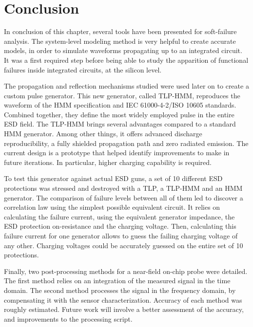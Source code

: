 \section{Conclusion}

In conclusion of this chapter, several tools have been presented for soft-failure analysis.
The system-level modeling method is very helpful to create accurate models, in order to simulate waveforms propagating up to an integrated circuit.
It was a first required step before being able to study the apparition of functional failures inside integrated circuits, at the silicon level.

The propagation and reflection mechanisms studied were used later on to create a custom pulse generator.
This new generator, called TLP-HMM, reproduces the waveform of the HMM specification and IEC 61000-4-2/ISO 10605 standards.
Combined together, they define the most widely employed pulse in the entire ESD field.
The TLP-HMM brings several advantages compared to a standard HMM generator.
Among other things, it offers advanced discharge reproducibility, a fully shielded propagation path and zero radiated emission.
The current design is a prototype that helped identify improvements to make in future iterations.
In particular, higher charging capability is required.

To test this generator against actual ESD guns, a set of 10 different ESD protections was stressed and destroyed with a TLP, a TLP-HMM and an HMM generator.
The comparison of failure levels between all of them led to discover a correlation law using the simplest possible equivalent circuit.
It relies on calculating the failure current, using the equivalent generator impedance, the ESD protection on-resistance and the charging voltage.
Then, calculating this failure current for one generator allows to guess the failing charging voltage of any other.
Charging voltages could be accurately guessed on the entire set of 10 protections.

Finally, two post-processing methods for a near-field on-chip probe were detailed.
The first method relies on an integration of the measured signal in the time domain.
The second method processes the signal in the frequency domain, by compensating it with the sensor characterization.
Accuracy of each method was roughly estimated.
Future work will involve a better assessment of the accuracy, and improvements to the processing script.
